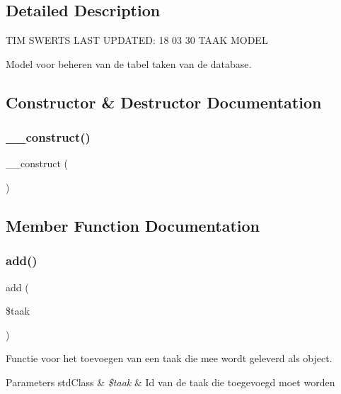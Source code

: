 \subsection{Detailed Description}
T\+IM S\+W\+E\+R\+TS L\+A\+ST U\+P\+D\+A\+T\+ED\+: 18 03 30 T\+A\+AK M\+O\+D\+EL

Model voor beheren van de tabel taken van de database. 

\subsection{Constructor \& Destructor Documentation}
\mbox{\label{class_taken___model_a095c5d389db211932136b53f25f39685}} 
\subsubsection{\texorpdfstring{\+\_\+\+\_\+construct()}{\_\_construct()}}
{\footnotesize\ttfamily \+\_\+\+\_\+construct (\begin{DoxyParamCaption}{ }\end{DoxyParamCaption})}



\subsection{Member Function Documentation}
\mbox{\label{class_taken___model_ab4986b088d8f7831b9a8dce8e97485bb}} 
\subsubsection{\texorpdfstring{add()}{add()}}
{\footnotesize\ttfamily add (\begin{DoxyParamCaption}\item[{}]{\$taak }\end{DoxyParamCaption})}



Functie voor het toevoegen van een taak die mee wordt geleverd als object. 


\begin{DoxyParams}[1]{Parameters}
std\+Class & {\em \$taak} & Id van de taak die toegevoegd moet worden \\
\hline
\end{DoxyParams}
\mbox{\label{class_taken___model_a2f8258add505482d7f00ea26493a5723}} 
